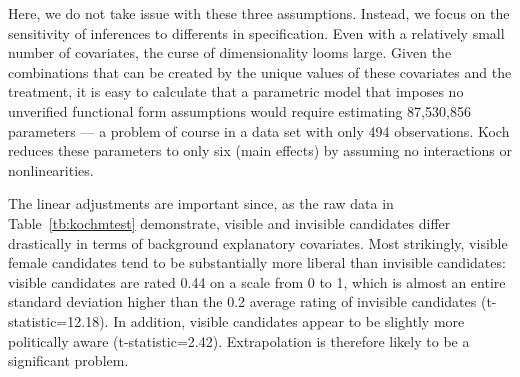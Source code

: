 \documentclass[11pt,titlepage]{article}
\begin{document}
Here, we do not take issue with these three assumptions.  Instead, we
focus on the sensitivity of inferences to differents in specification.
Even with a relatively small number of covariates, the curse of
dimensionality looms large.  Given the combinations that can be
created by the unique values of these covariates and the treatment, it
is easy to calculate that a parametric model that imposes no
unverified functional form assumptions would require estimating
87,530,856 parameters --- a problem of course in a data set with only
494 observations.  Koch reduces these parameters to only six (main
effects) by assuming no interactions or nonlinearities.

The linear adjustments are important since, as the raw data in
Table~\ref{tb:kochmtest} demonstrate, visible and invisible candidates
differ drastically in terms of background explanatory covariates.
Most strikingly, visible female candidates tend to be substantially
more liberal than invisible candidates: visible candidates are rated
0.44 on a scale from 0 to 1, which is almost an entire standard
deviation higher than the 0.2 average rating of invisible candidates
(t-statistic=12.18).  In addition, visible candidates appear to be
slightly more politically aware (t-statistic=2.42).  Extrapolation is
therefore likely to be a significant problem.
\end{document}
